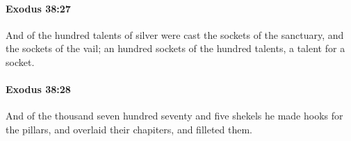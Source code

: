 		\paragraph{Exodus 38:27} %
			\label{EXODUS-38-27}

			And of the hundred talents of silver were cast the sockets of the sanctuary, and the sockets of the vail; an hundred sockets of the hundred talents, a talent for a socket.


		\paragraph{Exodus 38:28} %
			\label{EXODUS-38-28}

			And of the thousand seven hundred seventy and five shekels he made hooks for the pillars, and overlaid their chapiters, and filleted them.


